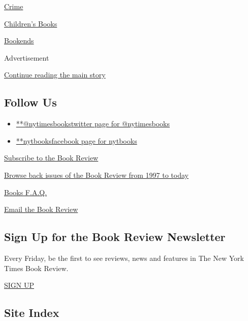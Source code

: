 \href{https://www.nytimes3xbfgragh.onion/column/crime}{Crime}

\href{https://www.nytimes3xbfgragh.onion/column/childrens-books}{Children's
Books}

\href{https://www.nytimes3xbfgragh.onion/column/bookends}{Bookends}

Advertisement

\protect\hyperlink{after-mktg}{Continue reading the main story}

\hypertarget{follow-us}{%
\subsection{Follow Us}\label{follow-us}}

\begin{itemize}
\tightlist
\item
  \href{https://twitter.com/nytimesbooks}{**@nytimesbookstwitter page
  for @nytimesbooks}
\item
  \href{https://www.facebookcorewwwi.onion/nytbooks}{**nytbooksfacebook
  page for nytbooks}
\end{itemize}

\href{https://homedelivery.nytimes3xbfgragh.onion/HDS/BookReviewHome.do?mode=BookReviewHome\&ref=review}{Subscribe
to the Book Review}

\href{https://www.nytimes3xbfgragh.onion/2014/07/29/books/review/the-new-york-times-book-review-back-issues.html}{Browse
back issues of the Book Review from 1997 to today}

\href{https://www.nytimes3xbfgragh.onion/membercenter/faq/books.html?ref=review}{Books
F.A.Q.}

\href{mailto:books@NYTimes.com}{Email the Book Review}

\hypertarget{sign-up-for-the-book-review-newsletter}{%
\subsection{Sign Up for the Book Review
Newsletter}\label{sign-up-for-the-book-review-newsletter}}

Every Friday, be the first to see reviews, news and features in The New
York Times Book Review.

\href{/newsletters/signup/BK}{SIGN UP}

\hypertarget{site-index}{%
\subsection{Site Index}\label{site-index}}

